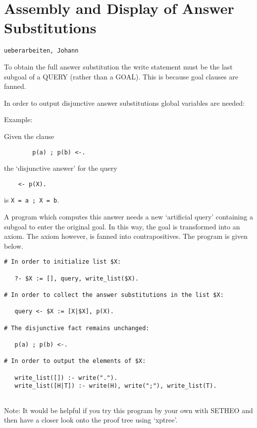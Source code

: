 %

\section{Assembly and Display of Answer Substitutions}

{\tt ueberarbeiten, Johann}


   To obtain the full answer substitution the write statement 
         must be the last subgoal of a QUERY (rather than a GOAL). 
	 This is because goal clauses are fanned.

	 In order to output disjunctive answer substitutions 
	 global variables are needed:

Example:

   Given the clause

\begin{verbatim}
        p(a) ; p(b) <-.
\end{verbatim}

   the `disjunctive answer' for the query

\begin{verbatim}
	<- p(X).
\end{verbatim}

   is {\tt X = a ; X = b}.


  A program which computes this answer needs a new `artificial query' 
  containing a subgoal to enter the original goal. In this way, the 
  goal is transformed into an axiom. The axiom however, is fanned into
  contrapositives. The program is given below.

\begin{verbatim}
# In order to initialize list $X:

   ?- $X := [], query, write_list($X).
   
# In order to collect the answer substitutions in the list $X:

   query <- $X := [X|$X], p(X).

# The disjunctive fact remains unchanged:

   p(a) ; p(b) <-.

# In order to output the elements of $X:

   write_list([]) :- write(".").
   write_list([H|T]) :- write(H), write(";"), write_list(T).
   
\end{verbatim}

Note: It would be helpful if you try this program by your own with SETHEO 
      and then have a closer look onto the proof tree using `xptree'.



